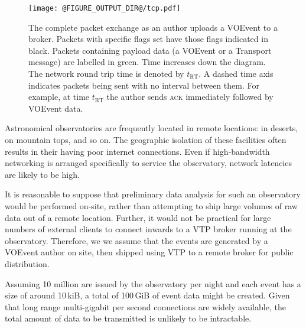 \documentclass[5p,authoryear]{elsarticle}
\begin{document}
\begin{figure}
  \begin{center}
  \texttt{[image: @FIGURE\_OUTPUT\_DIR@/tcp.pdf]}
  \end{center}

  \caption{The complete packet exchange as an author uploads a VOEvent to a
  broker. Packets with specific flags set have those flags indicated in black.
  Packets containing payload data (a VOEvent or a Transport message) are
  labelled in green.  Time increases down the diagram. The network round trip
  time is denoted by $t_\mathrm{RT}$. A dashed time axis indicates packets
  being sent with no interval between them. For example, at time
  $t_\mathrm{RT}$ the author sends \textsc{ack} immediately followed by
  VOEvent data.}

  \label{fig:tcp}
\end{figure}

Astronomical observatories are frequently located in remote locations: in
deserts, on mountain tops, and so on. The geographic isolation of these
facilities often results in their having poor internet connections. Even if
high-bandwidth networking is arranged specifically to service the observatory,
network latencies are likely to be high.

It is reasonable to suppose that preliminary data analysis for such an
observatory would be performed on-site, rather than attempting to ship large
volumes of raw data out of a remote location. Further, it would not be
practical for large numbers of external clients to connect inwards to a
VTP broker running at the observatory. Therefore, we we assume that the events
are generated by a VOEvent author on site, then shipped using VTP to a remote
broker for public distribution.

Assuming 10 million are issued by the observatory per night and each event
has a size of around 10\,kiB, a total of 100\,GiB of event data might be
created. Given that long range multi-gigabit per second connections are widely
available, the total amount of data to be transmitted is unlikely to be
intractable.
\end{document}
